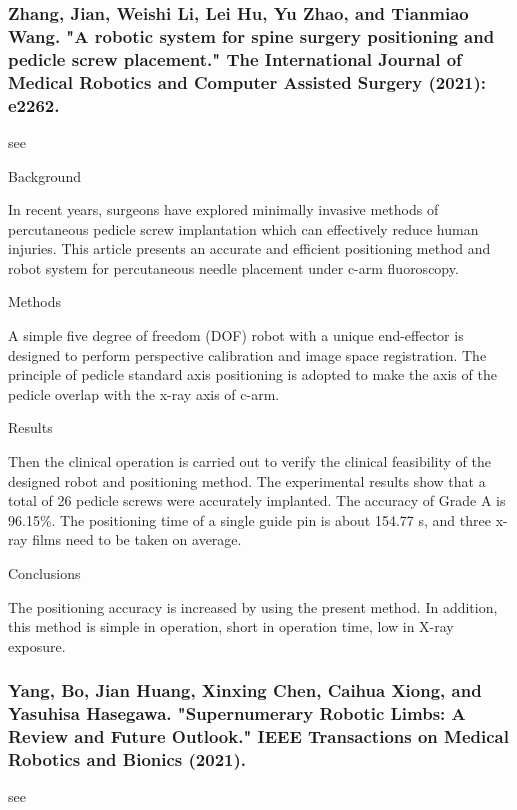 \documentclass[conference]{IEEEtran}
\begin{document}
\medskip
\subsubsection{Zhang, Jian, Weishi Li, Lei Hu, Yu Zhao, and Tianmiao Wang. "A robotic system for spine surgery positioning and pedicle screw placement." The International Journal of Medical Robotics and Computer Assisted Surgery (2021): e2262.}
see \cite{zhang2021robotic}

Background

In recent years, surgeons have explored minimally invasive methods of percutaneous pedicle screw implantation which can effectively reduce human injuries. This article presents an accurate and efficient positioning method and robot system for percutaneous needle placement under c-arm fluoroscopy.

Methods

A simple five degree of freedom (DOF) robot with a unique end-effector is designed to perform perspective calibration and image space registration. The principle of pedicle standard axis positioning is adopted to make the axis of the pedicle overlap with the x-ray axis of c-arm.

Results

Then the clinical operation is carried out to verify the clinical feasibility of the designed robot and positioning method. The experimental results show that a total of 26 pedicle screws were accurately implanted. The accuracy of Grade A is 96.15\%. The positioning time of a single guide pin is about 154.77 s, and three x-ray films need to be taken on average.

Conclusions

The positioning accuracy is increased by using the present method. In addition, this method is simple in operation, short in operation time, low in X-ray exposure.

\medskip
\subsubsection{Yang, Bo, Jian Huang, Xinxing Chen, Caihua Xiong, and Yasuhisa Hasegawa. "Supernumerary Robotic Limbs: A Review and Future Outlook." IEEE Transactions on Medical Robotics and Bionics (2021).}
see \cite{yang2021supernumerary}
\end{document}
